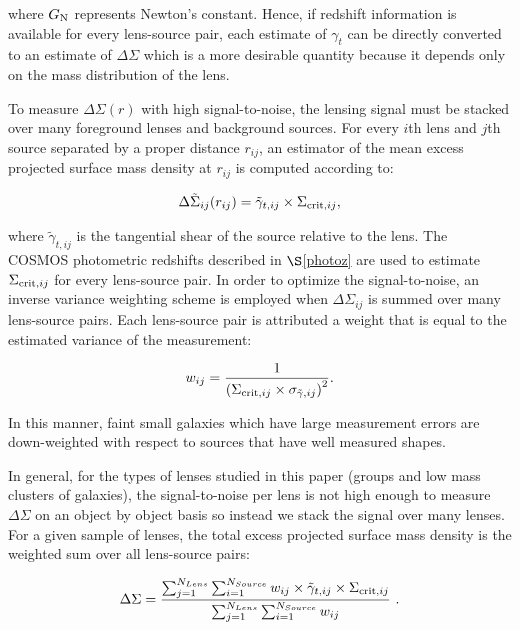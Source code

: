 \documentclass[12pt]{emulateapj}
\begin{document}
\noindent where $G_{\rm N}$ represents Newton's constant. Hence, if
  redshift information is available for every lens-source pair, each
  estimate of $\gamma_{t}$ can be directly converted to an estimate of
  $\Delta\Sigma$ which is a more desirable quantity because it
  depends only on the mass distribution of the lens.

To measure $\Delta\Sigma(r)$ with high signal-to-noise, the lensing
signal must be stacked over many foreground lenses and background
sources. For every $i$th lens and $j$th source separated by a proper
distance $r_{ij}$, an estimator of the mean excess projected surface
mass density at $r_{ij}$ is computed according to:

\begin{equation}
  \Delta \tilde\Sigma_{ij}(r_{ij})=\tilde\gamma_{t,ij}\times \Sigma_{{\rm crit},ij},
\label{dsigma5}
\end{equation}

\noindent where $\tilde\gamma_{t,ij}$ is the tangential shear of the
source relative to the lens. The COSMOS photometric redshifts
described in $\S$\ref{photoz} are used to estimate $\Sigma_{{\rm
    crit},ij}$ for every lens-source pair. In order to optimize the
signal-to-noise, an inverse variance weighting scheme is employed when
$\Delta\Sigma_{ij}$ is summed over many lens-source pairs. Each
lens-source pair is attributed a weight that is equal to the estimated
variance of the measurement:

\begin{equation}
  w_{ij} = \frac{1}{ \left( \Sigma_{{\rm crit},ij} \times \sigma_{\tilde\gamma,ij} \right)^2}. 
\end{equation}

In this manner, faint small galaxies which have large measurement
errors are down-weighted with respect to sources that have well
measured shapes.

In general, for the types of lenses studied in this paper (groups and
low mass clusters of galaxies), the signal-to-noise per lens is not
high enough to measure $\Delta\Sigma$ on an object by object basis so
instead we stack the signal over many lenses. For a given sample of
lenses, the total excess projected surface mass density is the
weighted sum over all lens-source pairs:

\begin{equation}
  \Delta\Sigma =  
  {\sum_{j=1}^{N_{Lens}} \sum_{i=1}^{N_{Source}} w_{ij} \times \tilde\gamma_{t,ij}\times \Sigma_{{\rm crit},ij}
    \over \sum_{j=1}^{N_{Lens}} \sum_{i=1}^{N_{Source}}w_{ij}} ~.
\end{equation}
\end{document}
